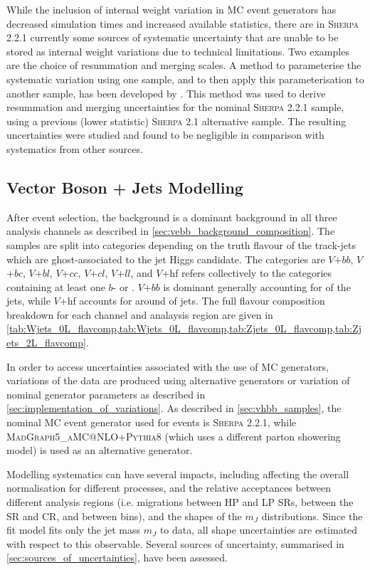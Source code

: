 While the inclusion of internal weight variation in MC event generators has decreased simulation times and increased available statistics, there are in \textsc{Sherpa 2.2.1} currently some sources of systematic uncertainty that are unable to be stored as internal weight variations due to technical limitations.
Two examples are the choice of resummation and merging scales.
A method to parameterise the systematic variation using one sample, and to then apply this parameterisation to another sample, has been developed by \ATLAS \cite{Anders:2125718}.
This method was used to derive resummation and merging uncertainties for the nominal \textsc{Sherpa 2.2.1} sample, using a previous (lower statistic) \textsc{Sherpa 2.1} alternative sample.
The resulting uncertainties were studied and found to be negligible in comparison with systematics from other sources.

\subsection{Vector Boson + Jets Modelling}

After event selection, the \Vjets background is a dominant background in all three analysis channels as described in \cref{sec:vebb_background_composition}.
The \Vjets samples are split into categories depending on the truth flavour of the track-jets which are ghost-associated to the \largeR jet Higgs candidate.
The categories are $V$+$bb$, $V$+$bc$, $V$+$bl$, $V$+$cc$, $V$+$cl$, $V$+$ll$, and $V$+hf refers collectively to the categories containing at least one $b$- or \cjet.
$V$+$bb$ is dominant generally accounting for  of the jets, while $V$+hf accounts for around  of jets.
The full flavour composition breakdown for each channel and analaysis region are given in \cref{tab:Wjets_0L_flavcomp,tab:Wjets_0L_flavcomp,tab:Zjets_0L_flavcomp,tab:Zjets_2L_flavcomp}.

In order to access uncertainties associated with the use of MC generators, variations of the data are produced using alternative generators or variation of nominal generator parameters as described in \cref{sec:implementation_of_variations}.
As described in \cref{sec:vhbb_samples}, the nominal MC event generator used for \Vjets events is \textsc{Sherpa 2.2.1}, while \textsc{MadGraph5\_aMC@NLO+Pythia8} (which uses a different parton showering model) is used as an alternative generator.

Modelling systematics can have several impacts, including affecting the overall normalisation for different processes, and the relative acceptances between different analysis regions (i.e. migrations between HP and LP SRs, between the SR and CR, and between \pTV bins), and the shapes of the $m_J$ distributions.
Since the fit model fits only the \largeR jet mass $m_J$ to data, all shape uncertainties are estimated with respect to this observable.
Several sources of uncertainty, summarised in \cref{sec:sources_of_uncertainties}, have been assessed.

